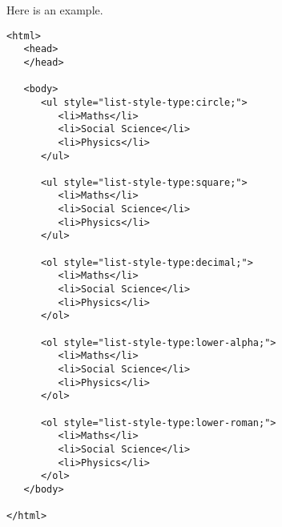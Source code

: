 \documentclass[a4paper,oneside]{book}
\numberwithin{equation}{chapter}
\begin{document}
Here is an example.
\begin{verbatim}
<html>
   <head>
   </head>
   
   <body>
      <ul style="list-style-type:circle;">
         <li>Maths</li>
         <li>Social Science</li>
         <li>Physics</li>
      </ul>
      
      <ul style="list-style-type:square;">
         <li>Maths</li>
         <li>Social Science</li>
         <li>Physics</li>
      </ul>
      
      <ol style="list-style-type:decimal;">
         <li>Maths</li>
         <li>Social Science</li>
         <li>Physics</li>
      </ol>
      
      <ol style="list-style-type:lower-alpha;">
         <li>Maths</li>
         <li>Social Science</li>
         <li>Physics</li>
      </ol>
      
      <ol style="list-style-type:lower-roman;">
         <li>Maths</li>
         <li>Social Science</li>
         <li>Physics</li>
      </ol>
   </body>
   
</html>
\end{verbatim}
\end{document}
